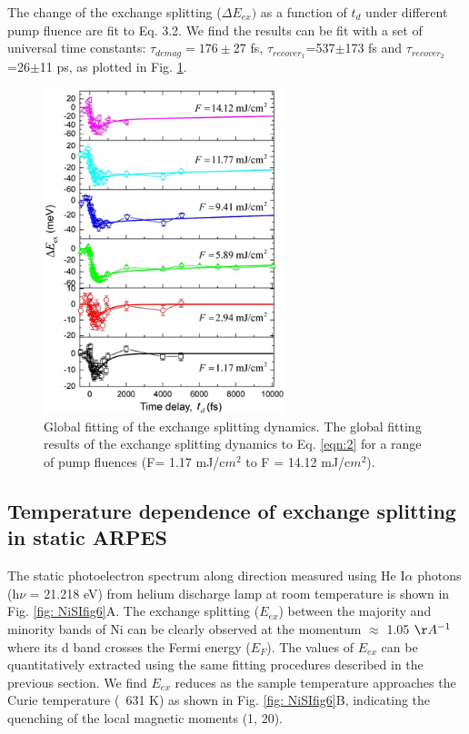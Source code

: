 The change of the exchange splitting  ($\Delta E_{ex})$ as a function of $t_d$ under different pump fluence are fit to Eq. 3.2. We find the results can be fit with a set of universal time constants: $\tau_{demag}=176\pm$27 fs, $\tau_{recover_1}$=537$\pm$173 fs and $\tau_{recover_2}$=26$\pm$11 ps, as plotted in Fig. \ref{fig: NiSIfig5}.

\begin{figure}[htbp]
	\begin{center}
		\includegraphics[width=70mm]{figs/NiFigS5}
	\end{center}
	\caption{Global fitting of the exchange splitting dynamics. The global fitting results of the exchange splitting dynamics to Eq. \ref{eqn:2} for a range of pump fluences (F= 1.17 mJ/c$m^2$ to F = 14.12 mJ/c$m^2$).}
	\label{fig: NiSIfig5}
\end{figure}

\subsection{Temperature dependence of exchange splitting in static ARPES}
The static photoelectron spectrum along  direction measured using He I$\alpha$ photons (h$\nu$ = 21.218 eV) from helium discharge lamp at room temperature is shown in Fig. \ref{fig: NiSIfig6}A. The exchange splitting ($E_{ex}$) between the majority and minority bands of Ni can be clearly observed at the momentum  $\approx$ 1.05 $\AA^{-1}$ where its d band crosses the Fermi energy ($E_F$). The values of $E_{ex}$ can be quantitatively extracted using the same fitting procedures described in the previous section. We find $E_{ex}$ reduces as the sample temperature approaches the Curie temperature (~631 K) as shown in Fig. \ref{fig: NiSIfig6}B, indicating the quenching of the local magnetic moments (1, 20).

